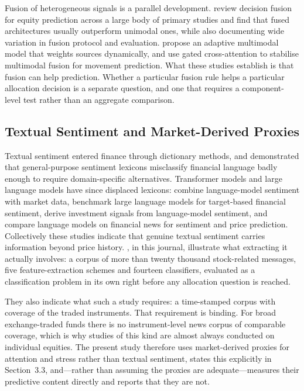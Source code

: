 Fusion of heterogeneous signals is a parallel development. \citet{zhang22} review
decision fusion for equity prediction across a large body of primary studies and find
that fused architectures usually outperform unimodal ones, while also documenting wide
variation in fusion protocol and evaluation. \citet{farimani24} propose an adaptive
multimodal model that weights sources dynamically, and \citet{zong25} use gated
cross-attention to stabilise multimodal fusion for movement prediction. What these
studies establish is that fusion can help prediction. Whether a particular fusion rule
helps a particular allocation decision is a separate question, and one that requires a
component-level test rather than an aggregate comparison.

\subsection{Textual Sentiment and Market-Derived Proxies}

Textual sentiment entered finance through dictionary methods, and
\citet{loughran11} demonstrated that general-purpose sentiment lexicons misclassify
financial language badly enough to require domain-specific alternatives. Transformer
models and large language models have since displaced lexicons: \citet{officioso26}
combine language-model sentiment with market data, \citet{muhammad26} benchmark large
language models for target-based financial sentiment, \citet{mun25} derive investment
signals from language-model sentiment, and \citet{chuang25} compare language models on
financial news for sentiment and price prediction. Collectively these studies indicate
that genuine textual sentiment carries information beyond price history.
\citet{george25}, in this journal, illustrate what extracting it actually involves: a
corpus of more than twenty thousand stock-related messages, five feature-extraction
schemes and fourteen classifiers, evaluated as a classification problem in its own
right before any allocation question is reached.

They also indicate what such a study requires: a time-stamped corpus with coverage of
the traded instruments. That requirement is binding. For broad exchange-traded funds
there is no instrument-level news corpus of comparable coverage, which is why studies
of this kind are almost always conducted on individual equities. The present study
therefore uses market-derived proxies for attention and stress rather than textual
sentiment, states this explicitly in Section~3.3, and---rather than assuming the proxies
are adequate---measures their predictive content directly and reports that they are
not.

